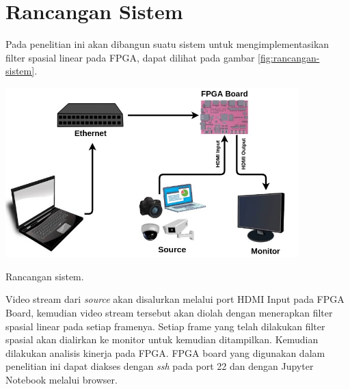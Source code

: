 \section{Rancangan Sistem}
Pada penelitian ini akan dibangun suatu sistem untuk mengimplementasikan filter spasial linear pada FPGA, dapat dilihat pada gambar \ref{fig:rancangan-sistem}.
\begin{afigure}
    \includegraphics[width=0.85\textwidth, center]{images/rancangan-sistem.jpg}
    \caption{Rancangan sistem.}
    \label{fig:rancangan-sistem}
\end{afigure}

Video stream dari \textit{source} akan disalurkan melalui port HDMI Input pada FPGA Board, kemudian video stream tersebut akan diolah dengan menerapkan filter spasial linear pada setiap framenya. Setiap frame yang telah dilakukan filter spasial akan dialirkan ke monitor untuk kemudian ditampilkan. Kemudian dilakukan analisis kinerja pada FPGA. FPGA board yang digunakan dalam penelitian ini dapat diakses dengan \textit{ssh} pada port 22 dan dengan Jupyter Notebook melalui browser.

